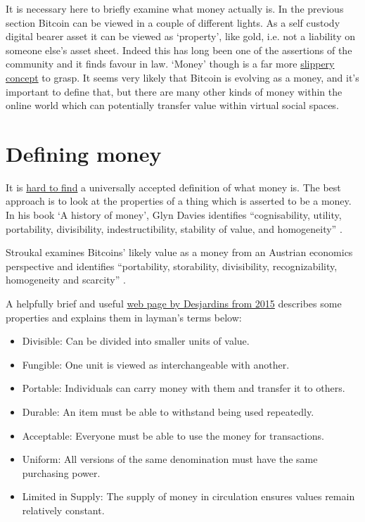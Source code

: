 It is necessary here to briefly examine what money actually is. In the previous section Bitcoin can be viewed in a couple of different lights. As a self custody digital bearer asset it can be viewed as `property', like gold, i.e. not a liability on someone else's asset sheet. Indeed this has long been one of the assertions of the community and it finds favour in law. `Money' though is a far more \href{https://www.bankofengland.co.uk/knowledgebank/what-is-money}{slippery concept} to grasp. It seems very likely that Bitcoin is evolving as a money, and it's important to define that, but there are many other kinds of money within the online world which can potentially transfer value within virtual social spaces.
\section{Defining money}
It is \href{https://www.lynalden.com/what-is-money/}{hard to find} a universally accepted definition of what money is. The best approach is to look at the properties of a thing which is asserted to be a money. In his book `A history of money', Glyn Davies identifies ``cognisability, utility,  portability, divisibility, indestructibility, stability of value, and homogeneity'' \cite{davies2010history}.\par
Stroukal examines Bitcoins' likely value as a money from an Austrian economics perspective and identifies ``portability, storability, divisibility, recognizability, homogeneity and scarcity'' \cite{stroukal2018can}.\par
A helpfully brief and useful \href{http://money.visualcapitalist.com/infographic-the-properties-of-money/}{web page by Desjardins from 2015} describes some properties and explains them in layman's terms below:
\begin{itemize}
\item Divisible: Can be divided into smaller units of value.
\item Fungible: One unit is viewed as interchangeable with another.
\item Portable: Individuals can carry money with them and transfer it to others.
\item Durable: An item must be able to withstand being used repeatedly.
\item Acceptable: Everyone must be able to use the money for transactions.
\item Uniform: All versions of the same denomination must have the same purchasing power.
\item Limited in Supply: The supply of money in circulation ensures values remain relatively constant.
\end{itemize}
